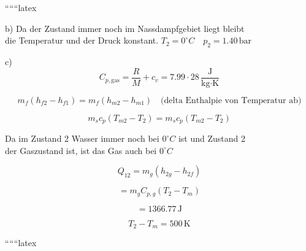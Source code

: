 ``````latex


b) Da der Zustand immer noch im Nassdampfgebiet liegt bleibt \\
die Temperatur und der Druck konstant. $T_2 = 0^\circ C \quad p_2 = 1.40 \, \text{bar}$

c) 
\[
C_{p, \text{gas}} = \frac{R}{M} + c_v = 7.99 \cdot 28 \, \frac{\text{J}}{\text{kg} \cdot \text{K}}
\]

\[
m_f (h_{f2} - h_{f1}) = m_f (h_{m2} - h_{m1}) \quad \text{(delta Enthalpie von Temperatur ab)}
\]

\[
m_s c_p (T_{m2} - T_2) = m_s c_p (T_{m2} - T_2)
\]

Da im Zustand 2 Wasser immer noch bei $0^\circ C$ ist und Zustand 2 \\
der Gaszustand ist, ist das Gas auch bei $0^\circ C$

\[
Q_{12} = m_g (h_{2g} - h_{2f})
\]

\[
= m_g C_{p,g} (T_2 - T_m)
\]

\[
= 1366.77 \, \text{J}
\]

\[
T_2 - T_m = 500 \, \text{K}
\]

``````latex


